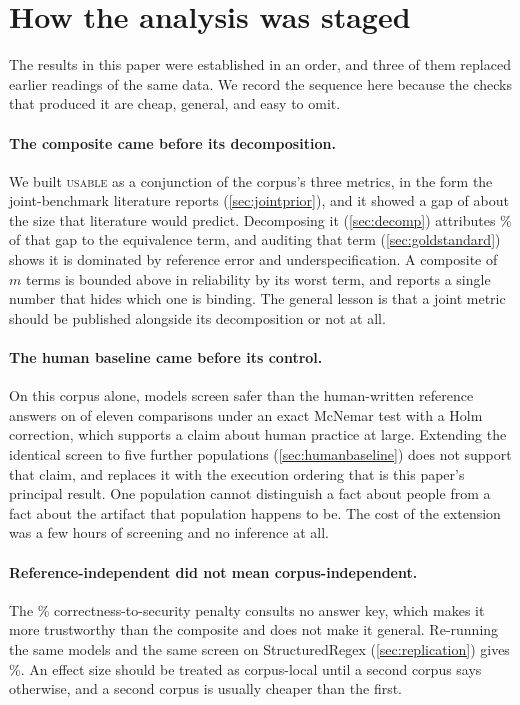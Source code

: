\documentclass[11pt]{article}
\newcommand{\usable}{\textsc{usable}}
\begin{document}
\section{How the analysis was staged}
\label{app:staging}

The results in this paper were established in an order, and three of them
replaced earlier readings of the same data. We record the sequence here
because the checks that produced it are cheap, general, and easy to omit.

\paragraph{The composite came before its decomposition.} We built \usable{}
as a conjunction of the corpus's three metrics, in the form the
joint-benchmark literature reports (\cref{sec:jointprior}), and it showed a
gap of about the size that literature would predict. Decomposing it
(\cref{sec:decomp}) attributes \equivshare{}\% of that gap to the equivalence
term, and auditing that term (\cref{sec:goldstandard}) shows it is dominated
by reference error and underspecification. A composite of $m$ terms is
bounded above in reliability by its worst term, and reports a single number
that hides which one is binding. The general lesson is that a joint metric
should be published alongside its decomposition or not at all.

\paragraph{The human baseline came before its control.} On this corpus alone,
models screen safer than the human-written reference answers on \holmcount{}
of eleven comparisons under an exact McNemar test with a Holm correction,
which supports a claim about human practice at large. Extending the identical
screen to five further populations (\cref{sec:humanbaseline}) does not support
that claim, and replaces it with the execution ordering that is this paper's
principal result. One population cannot distinguish a fact about people from
a fact about the artifact that population happens to be. The cost of the
extension was a few hours of screening and no inference at all.

\paragraph{Reference-independent did not mean corpus-independent.} The
\vulngivencorrect{}\% correctness-to-security penalty consults no answer key,
which makes it more trustworthy than the composite and does not make it
general. Re-running the same models and the same screen on StructuredRegex
(\cref{sec:replication}) gives \srvulngivencorrect{}\%. An effect size should
be treated as corpus-local until a second corpus says otherwise, and a second
corpus is usually cheaper than the first.
\end{document}
